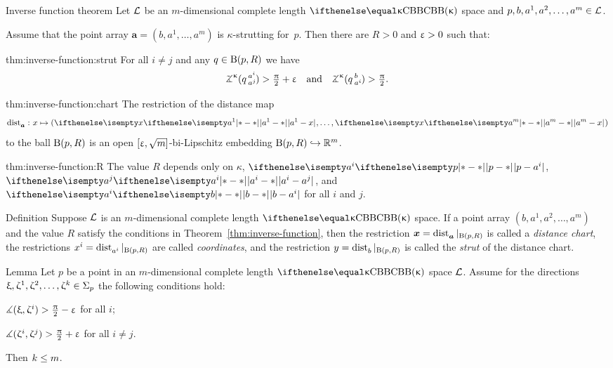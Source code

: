 \begin{thm}{Inverse function theorem}\label{thm:inverse-function}
Let $\mathcal{L}$ be an $m$-dimensional complete length $\Alex\kappa$ space 
and $p,b,a^1,a^2,\dots,a^m\in\spc{L}$.

Assume that the point array $\bm{a}=(b,a^1,\dots,a^m)$ is $\kappa$-strutting for~$p$.
Then
there are $R>0$ and $\upvarepsilon>0$ such that:

\begin{subthm}{thm:inverse-function:strut}
For all $i\ne j$ and any $q\in\oBall(p,R)$ we have
\[\angk\kappa{q}{a^i}{a^j}>\tfrac{\pi}{2}+\eps
\quad\text{and}\quad
\angk\kappa{q}{b}{a^i}>\tfrac{\pi}{2}.\]

\end{subthm}

\begin{subthm}{thm:inverse-function:chart}
The restriction of the distance map 
\[\distfun{\bm{a}}{}{}\:x\mapsto(\dist{a^1}{x}{},\dots,\dist{a^m}{x}{})\] 
to the ball $\mathrm{B}{}(p,R)$
is an open $[\upvarepsilon,\sqrt{m}]$-bi-Lipschitz embedding $\oBall(p,R)\hookrightarrow\RR^m$.
\end{subthm}

\begin{subthm}{thm:inverse-function:R}
The value $R$ depends only on $\kappa$, $\dist{p}{a^i}{}$, $\dist{a^i}{a^j}{}$, and $\dist{b}{a^i}{}$
for all $i$ and $j$.
\end{subthm}

\end{thm}

\begin{thm}{Definition}\label{def:dist-chart}
Suppose $\mathcal{L}$ is an $m$-dimensional complete length $\Alex\kappa$ space.
If a point array $(b,a^1,a^2,\dots,a^m)$ 
and the value $R$ satisfy the conditions in Theorem~\ref{thm:inverse-function}, 
then the restriction 
$\bm{x}=\mathop{\rm dist}\nolimits_{\bm{a}}^{{}}{}{}|_{\mathrm{B}{}(p,R)}$
is called a \emph{distance chart},
the restrictions $x^i=\mathop{\rm dist}\nolimits_{a^i}^{{}}{}{}|_{\mathrm{B}{}(p,R)}$ are called \emph{coordinates}, 
and the restriction $y=\mathop{\rm dist}\nolimits_{b}^{{}}{}{}|_{\mathrm{B}{}(p,R)}$ is called  the \emph{strut} of the distance chart.
\end{thm}

\begin{thm}{Lemma}\label{lem:pack(S^m)+}
Let $p$ be a point in an $m$-dimensional complete length $\Alex\kappa$ space $\mathcal{L}$.
Assume for the directions $\xi,\zeta^1,\zeta^2,\dots,\zeta^\kay\in\Sigma_p$ the following conditions hold: 

\begin{subthm}{}
$\measuredangle(\upxi,\upzeta^i)>\tfrac{\uppi}2-\upvarepsilon$ for all $i$;
\end{subthm}

\begin{subthm}{}
$\measuredangle(\upzeta^i,\upzeta^j)>\tfrac{\uppi}2+\upvarepsilon$ for all $i\ne j$.
\end{subthm}
Then $\kay\le m$.
\end{thm}

